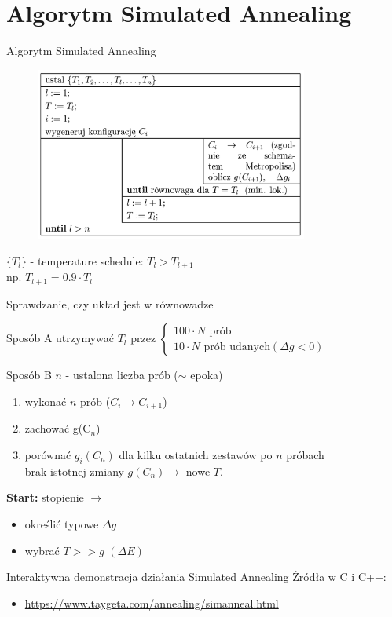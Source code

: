 \section{Algorytm Simulated Annealing}

	
	\begin{frame}{Algorytm Simulated Annealing}
		\begin{figure}
			\includegraphics[width=0.8\textwidth]{img/18/sa_algorithm}
		\end{figure}
		$\{T_l\}$ - temperature schedule: $T_l > T_{l+1}$\\
		np. $T_{l+1} = 0.9 \cdot T_l$
	\end{frame}

	\begin{frame}{Sprawdzanie, czy układ jest w równowadze}
		\begin{block}{Sposób A}
			utrzymywać $T_l$ przez $\begin{cases}
			100 \cdot N \text{ prób} \\
			10 \cdot N \text{ prób udanych} (\Delta g < 0)
			\end{cases}$
		\end{block}
		
		\begin{block}{Sposób B}
		$n$ - ustalona liczba prób ($\sim$ epoka)
		\begin{enumerate}
			\item wykonać $n$ prób ($C_i \rightarrow C_{i+1}$)
			\item zachować g(C$_n$)
			\item porównać $g_i(C_n)$ dla kilku ostatnich zestawów po $n$ próbach \\
			brak istotnej zmiany $g(C_n) \rightarrow$ nowe $T$.
		\end{enumerate}
		\end{block}
		\textbf{Start:} stopienie $\rightarrow$ 
		\begin{itemize}
			\item określić typowe $\Delta g$
			\item wybrać $T >> g$ $(\Delta E)$
		\end{itemize}
		
		
	\end{frame}
	
	\begin{frame}{Interaktywna demonstracja działania Simulated Annealing}
		Źródła w C i C++:
		\begin{itemize}
			\item 	\url{https://www.taygeta.com/annealing/simanneal.html}
		\end{itemize}
		
		
	\end{frame}